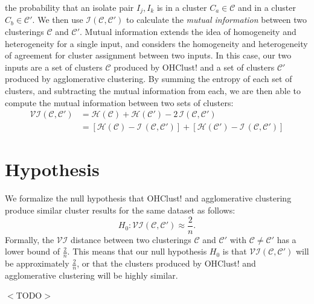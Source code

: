 \documentclass[12pt]{ucthesis}
\begin{document}
      the probability that an isolate pair $I_{j}, I_{k}$ is in a cluster $C_{a}
      \in \mathcal{C}$ and in a cluster $C_{b} \in \mathcal{C}'$. We then use
      $\mathcal{I}(\mathcal{C}, \mathcal{C}')$ to calculate the \textit{mutual
      information} between two clusterings $\mathcal{C}$ and $\mathcal{C}'$.
      Mutual information extends the idea of homogeneity and heterogeneity for
      a single input, and considers the homogeneity and heterogeneity of
      agreement for cluster assignment between two inputs. In this case, our
      two inputs are a set of clusters $\mathcal{C}$ produced by
      \textsf{OHClust!} and a set of clusters $\mathcal{C}'$ produced by
      \textsf{agglomerative clustering}. By summing the entropy of each set
      of clusters, and subtracting the mutual information from each, we are
      then able to compute the mutual information between two sets of clusters:
      \begin{align*}
         \mathcal{V}\mathcal{I}(\mathcal{C}, \mathcal{C}') &=
         \mathcal{H}(\mathcal{C}) + \mathcal{H}(\mathcal{C}') -
         2\,\mathcal{I}(\mathcal{C}, \mathcal{C}')
         \\
         &= [\mathcal{H}(\mathcal{C}) -
             \mathcal{I}\,(\mathcal{C}, \mathcal{C}')] +
            [\mathcal{H}(\mathcal{C}') -
             \mathcal{I}\,(\mathcal{C}, \mathcal{C}')]
      \end{align*}

   \section{Hypothesis}\label{sec:eval_goals}
      We formalize the null hypothesis that \textsf{OHClust!} and
      \textsf{agglomerative clustering} produce similar cluster results for the
      same dataset as follows:
      $$H_0: \mathcal{V}\mathcal{I}(\mathcal{C}, \mathcal{C}') \approx \frac{2}{n}.$$
      Formally, the $\mathcal{V}\mathcal{I}$ distance between two clusterings
      $\mathcal{C}$ and $\mathcal{C}'$ with $\mathcal{C} \not= \mathcal{C}'$
      has a lower bound of $\frac{2}{n}$. This means that our null hypothesis
      $H_0$ is that $\mathcal{V}\mathcal{I}(\mathcal{C}, \mathcal{C}')$ will be
      approximately $\frac{2}{n}$, or that the clusters produced by
      \textsf{OHClust!} and \textsf{agglomerative clustering} will be
      highly similar.

      $<$TODO$>$
\end{document}
